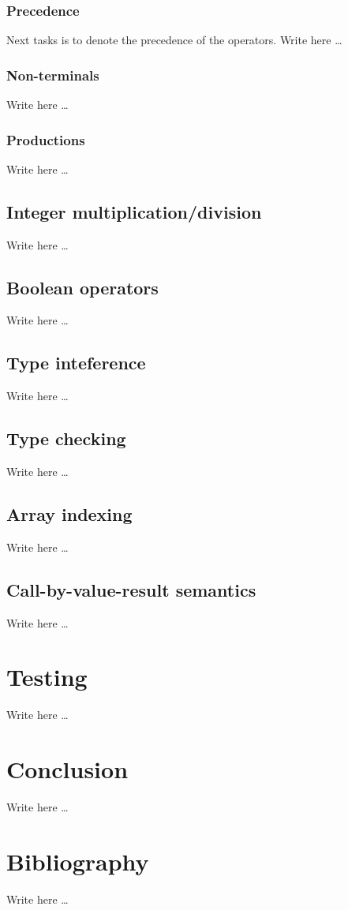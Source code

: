 \documentclass[10pt]{article}
\begin{document}
\subsubsection{Precedence}
Next tasks is to denote the precedence of the operators.
Write here \ldots

\subsubsection{Non-terminals}
Write here \ldots

\subsubsection{Productions}
Write here \ldots

\subsection{Integer multiplication/division}
Write here \ldots

\subsection{Boolean operators}
Write here \ldots

\subsection{Type inteference}
Write here \ldots

\subsection{Type checking}
Write here \ldots

\subsection{Array indexing}
Write here \ldots

\subsection{Call-by-value-result semantics}
Write here \ldots

\section{Testing}
Write here \ldots

\section{Conclusion}
Write here \ldots

\section{Bibliography}
Write here \ldots

\end{document}
